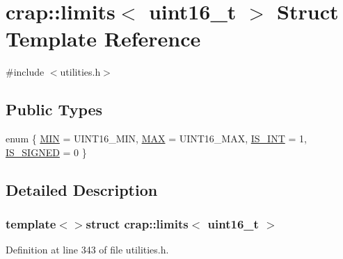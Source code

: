 \hypertarget{structcrap_1_1limits_3_01uint16__t_01_4}{\section{crap\+:\+:limits$<$ uint16\+\_\+t $>$ Struct Template Reference}
\label{structcrap_1_1limits_3_01uint16__t_01_4}
}


{\ttfamily \#include $<$utilities.\+h$>$}

\subsection*{Public Types}
\begin{DoxyCompactItemize}
\item 
enum \{ \hyperlink{structcrap_1_1limits_3_01uint16__t_01_4_a61ad3be761298f3e005f7be8769a8533a2d5ba59562182999fa680807805f9b02}{M\+I\+N} = U\+I\+N\+T16\+\_\+\+M\+I\+N, 
\hyperlink{structcrap_1_1limits_3_01uint16__t_01_4_a61ad3be761298f3e005f7be8769a8533ace042d7de7c9dbe8c168a8aa6ed6dff8}{M\+A\+X} = U\+I\+N\+T16\+\_\+\+M\+A\+X, 
\hyperlink{structcrap_1_1limits_3_01uint16__t_01_4_a61ad3be761298f3e005f7be8769a8533ad2448a3c8dcbb917b93e0df0f48caa43}{I\+S\+\_\+\+I\+N\+T} = 1, 
\hyperlink{structcrap_1_1limits_3_01uint16__t_01_4_a61ad3be761298f3e005f7be8769a8533afa01cb0a38841bacb8f892fd5f82bf5b}{I\+S\+\_\+\+S\+I\+G\+N\+E\+D} = 0
 \}
\end{DoxyCompactItemize}


\subsection{Detailed Description}
\subsubsection*{template$<$$>$struct crap\+::limits$<$ uint16\+\_\+t $>$}



Definition at line 343 of file utilities.\+h.



